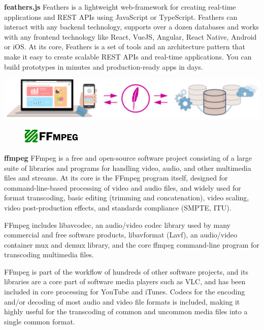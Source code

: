 	\vs
	\textbf{\Large feathers.js}
	\vs
	Feathers is a lightweight web-framework for creating real-time applications and REST APIs using JavaScript or TypeScript. Feathers can interact with any backend technology, supports over a dozen databases and works with any frontend technology like React, VueJS, Angular, React Native, Android or iOS. At its core, Feathers is a set of tools and an architecture pattern that make it easy to create scalable REST APIs and real-time applications. You can build prototypes in minutes and production-ready apps in days.
	\vs[1]
	\begin{center}
		\includegraphics[width=15cm]{feathersuse.png}
	\end{center}
	\vs[1]
	\begin{figure}
		\centering
		\vspace{-30pt}
		\includegraphics[width=0.25\textwidth]{ffmpeg.png}
		\vspace{-80pt}
	\end{figure}
	\vs
	\textbf{\Large ffmpeg}
	\vs
	FFmpeg is a free and open-source software project consisting of a large suite of libraries and programs for handling video, audio, and other multimedia files and streams. At its core is the FFmpeg program itself, designed for command-line-based processing of video and audio files, and widely used for format transcoding, basic editing (trimming and concatenation), video scaling, video post-production effects, and standards compliance (SMPTE, ITU).
	
	FFmpeg includes libavcodec, an audio/video codec library used by many commercial and free software products, libavformat (Lavf), an audio/video container mux and demux library, and the core ffmpeg command-line program for transcoding multimedia files.
	
	FFmpeg is part of the workflow of hundreds of other software projects, and its libraries are a core part of software media players such as VLC, and has been included in core processing for YouTube and iTunes. Codecs for the encoding and/or decoding of most audio and video file formats is included, making it highly useful for the transcoding of common and uncommon media files into a single common format.
	
